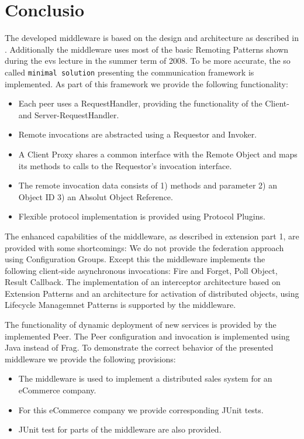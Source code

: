 \documentclass[a4paper]{article}
\begin{document}
\section{Conclusio}
The developed middleware is based on the design and architecture as described in \cite{zdun2008}. Additionally the middleware uses most of the basic Remoting Patterns shown during the evs lecture in the summer term of 2008. To be more accurate, the so called \texttt{minimal solution} presenting the communication framework is implemented. As part of this framework we provide the following functionality:
\begin{itemize}
\item Each peer uses a RequestHandler, providing the functionality of the Client- and Server-RequestHandler.
\item Remote invocations are abstracted using a Requestor and Invoker.
\item A Client Proxy shares a common interface with the Remote Object and maps its methods to calls to the Requestor's invocation interface.
\item The remote invocation data consists of 1) methods and parameter 2) an Object ID 3) an Absolut Object Reference.
\item Flexible protocol implementation is provided using Protocol Plugins.
\end{itemize}

The enhanced capabilities of the middleware, as described in extension part 1, are provided with some shortcomings: We do not provide the federation approach using Configuration Groups. Except this the middleware implements the following client-side asynchronous invocations: Fire and Forget, Poll Object, Result Callback. The implementation of an interceptor architecture based on Extension Patterns and an architecture for activation of distributed objects, using Lifecycle Managemnet Patterns is supported by the middleware.

The functionality of dynamic deployment of new services is provided by the implemented Peer. The Peer configuration and invocation is implemented using Java instead of Frag. To demonstrate the correct behavior of the presented middleware we provide the following provisions:
\begin{itemize}
\item The middleware is used to implement a distributed sales system for an eCommerce company.
\item For this eCommerce company we provide corresponding JUnit tests.
\item JUnit test for parts of the middleware are also provided.
\end{itemize}
\end{document}
